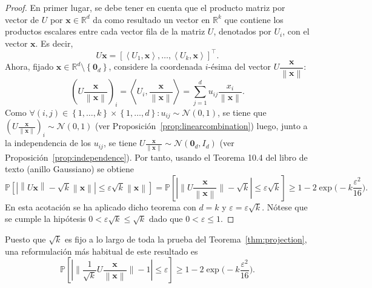 \begin{proof}
	En primer lugar, se debe tener en cuenta que el producto matriz por
	vector de $U$ por $\symbf{x} \in \mathbb{R}^d$ da como resultado un
	vector en $\mathbb{R}^k$ que contiene los productos escalares entre
	cada vector fila de la matriz $U$, denotados por $U_{i}$, con el
	vector $\symbf{x}$.
	Es decir,
	\begin{equation*}
		U\symbf{x}=
		{\left[
			\left\langle
			U_{1},\symbf{x}
			\right\rangle,
			\dotsc,
			\left\langle
			U_{k},\symbf{x}
			\right\rangle
			\right]}^{\top}.
	\end{equation*}
	Ahora, fijado
	$\symbf{x}\in\mathbb{R}^{d}\setminus\left\{\symbf{0}_{d}\right\}$,
	considere la coordenada $i$-ésima del vector
	$U\dfrac{\symbf{x}}{\left\|\symbf{x}\right\|}$:
	\begin{equation*}
		{\left(
			U\frac{\symbf{x}}{\left\|\symbf{x}\right\|}
			\right)}_{i}=
		\left\langle
		U_{i},
		\frac{\symbf{x}}{\left\|\symbf{x}\right\|}
		\right\rangle=
		\sum_{j=1}^{d}
		u_{ij}
		\frac{x_{i}}{\left\|\symbf{x}\right\|}.
	\end{equation*}
	Como
	\begin{math}
		\forall\left(i,j\right)\in
		\left\{1,\dotsc,k\right\}\times\left\{1,\dotsc,d\right\}:
		u_{ij}\sim\mathcal{N}\left(0,1\right)
	\end{math}, se tiene que
	\begin{math}
		{\left(
			U\frac{\symbf{x}}{\left\|\symbf{x}\right\|}
			\right)}_{i}\sim
		\mathcal{N}\left(0,1\right)
	\end{math}
	(ver Proposición~\ref{prop:linearcombination}) luego, junto a la
	independencia de los $u_{i j}$, se tiene
	\begin{math}
		U\frac{\symbf{x}}{\left\|\symbf{x}\right\|}\sim
		\mathcal{N}\left(\symbf{0}_{d},I_{d}\right)
	\end{math}
	(ver Proposición~\ref{prop:independence}).
	Por tanto, usando el Teorema 10.4 del libro de texto (anillo
	Gaussiano) se obtiene
	\begin{equation*}
		\mathbb{P}
		\left[
			\left|
			\left\|U\symbf{x}\right\|-
			\sqrt{k}\left\|\symbf{x}\right\|
			\right|\leq
			\varepsilon\sqrt{k}
			\left\|\symbf{x}\right\|
			\right]=
		\mathbb{P}
		\left[
			\left|
			\big\|
			U\frac{\symbf{x}}{\left\|\symbf{x}\right\|}
			\big\|-
			\sqrt{k}
			\right|\leq\varepsilon\sqrt{k}
			\right] \geq
		1-2\exp\Big(-k\frac{\varepsilon^{2}}{16}\Big).
	\end{equation*}
	En esta acotación se ha aplicado dicho teorema con $d=k$ y
	$\varepsilon=\varepsilon \sqrt{k}$.
	Nótese que se cumple la hipótesis
	$0<\varepsilon\sqrt{k}\leq\sqrt{k}$ dado que $0<\varepsilon\leq1$.
\end{proof}
Puesto que $\sqrt{k}$ es fijo a lo largo de toda la prueba del
Teorema~\ref{thm:projection}, una reformulación más habitual de este
resultado es
\begin{equation}
	\mathbb{P}
	\left[
		\left|
		\big\|
		\frac{1}{\sqrt{k}}
		U\frac{\symbf{x}}{\left\|\symbf{x}\right\|}
		\big\|-1
		\right|\leq
		\varepsilon
		\right]
	\geq 1-
	2\exp
	\Big(-k\frac{\varepsilon^{2}}{16}\Big).
\end{equation}

